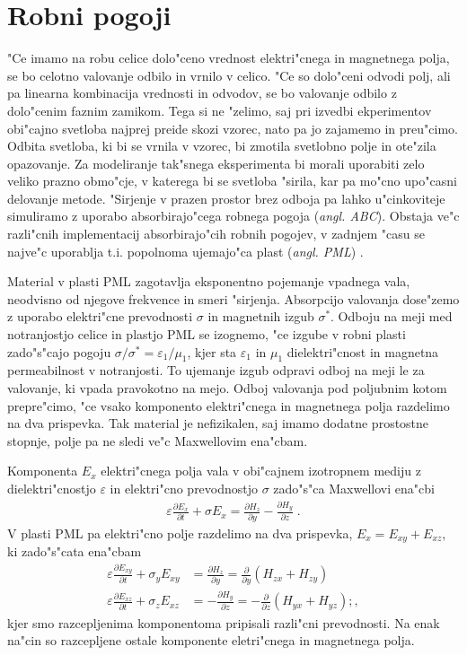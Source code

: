 \documentclass[12pt,twoside,openright,final,a4paper]{report}
\newcommand{\odvod}[2]{\frac{\partial #1}{\partial #2}}
\newcommand{\eps}{\varepsilon}
\newcommand{\angl}[1]{(\textit{angl. #1})}
\begin{document}
\section{Robni pogoji}

"Ce imamo na robu celice dolo"ceno vrednost elektri"cnega in magnetnega polja, se bo celotno valovanje odbilo in vrnilo v celico. 
"Ce so dolo"ceni odvodi polj, ali pa linearna kombinacija vrednosti in odvodov, se bo valovanje odbilo z dolo"cenim faznim zamikom. 
Tega si ne "zelimo, saj pri izvedbi ekperimentov obi"cajno svetloba najprej preide skozi vzorec, nato pa jo zajamemo in preu"cimo. 
Odbita svetloba, ki bi se vrnila v vzorec, bi zmotila svetlobno polje in ote"zila opazovanje. 
Za modeliranje tak"snega eksperimenta bi morali uporabiti zelo veliko prazno obmo"cje, v katerega bi se svetloba "sirila, kar pa mo"cno upo"casni delovanje metode. 
"Sirjenje v prazen prostor brez odboja pa lahko u"cinkoviteje simuliramo z uporabo absorbirajo"cega robnega pogoja \angl{\ac{ABC}}. 
Obstaja ve"c razli"cnih implementacij absorbirajo"cih robnih pogojev, v zadnjem "casu se najve"c uporablja t.i. popolnoma ujemajo"ca plast \angl{\ac{PML}} \cite{taflove,berenger}. 

Material v plasti \acs{PML} zagotavlja eksponentno pojemanje vpadnega vala, neodvisno od njegove frekvence in smeri "sirjenja. 
Absorpcijo valovanja dose"zemo z uporabo elektri"cne prevodnosti $\sigma$ in magnetnih izgub $\sigma^\ast$. 
Odboju na meji med notranjostjo celice in plastjo \acs{PML} se izognemo, "ce izgube v robni plasti zado"s"cajo pogoju $\sigma/\sigma^\ast = \eps_1/\mu_1$, kjer sta $\eps_1$ in $\mu_1$ dielektri"cnost in magnetna permeabilnost v notranjosti. 
To ujemanje izgub odpravi odboj na meji le za valovanje, ki vpada pravokotno na mejo. 
Odboj valovanja pod poljubnim kotom prepre"cimo, "ce vsako komponento elektri"cnega in magnetnega polja razdelimo na dva prispevka. 
Tak material je nefizikalen, saj imamo dodatne prostostne stopnje, polje pa ne sledi ve"c Maxwellovim ena"cbam. 

Komponenta $E_x$ elektri"cnega polja vala v obi"cajnem izotropnem mediju z dielektri"cnostjo $\eps$ in elektri"cno prevodnostjo $\sigma$ zado"s"ca Maxwellovi ena"cbi
\begin{align}
 \eps \odvod{E_x}{t} + \sigma E_x = \odvod{H_z}{y} - \odvod{H_y}{z}\;.
\end{align}
V plasti \acs{PML} pa elektri"cno polje razdelimo na dva prispevka, $E_x = E_{xy} + E_{xz}$, ki zado"s"cata ena"cbam
\begin{align}
 \eps \odvod{E_{xy}}{t} + \sigma_y E_{xy} &= \odvod{H_z}{y} = \odvod{}{y}(H_{zx} + H_{zy}) \\
 \eps \odvod{E_{xz}}{t} + \sigma_z E_{xz} &= -\odvod{H_y}{z} = -\odvod{}{z}(H_{yx} + H_{yz});,
\end{align}
kjer smo razcepljenima komponentoma pripisali razli"cni prevodnosti. 
Na enak na"cin so razcepljene ostale komponente eletri"cnega in magnetnega polja. 
\end{document}
